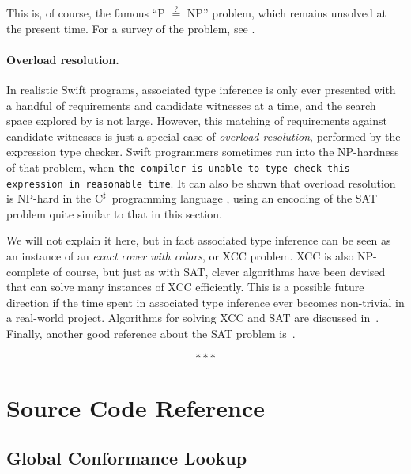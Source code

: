 \documentclass[../generics]{subfiles}
\begin{document}
This is, of course, the famous ``{P} $\stackrel{?}{=}$ {NP}'' problem, which remains unsolved at the present time. For a survey of the problem, see \cite{pvnp}.

\paragraph{Overload resolution.}
In realistic Swift programs, associated type inference is only ever presented with a handful of requirements and candidate witnesses at a time, and the search space explored by  is not large. However, this matching of requirements against candidate witnesses is just a special case of \emph{overload resolution}, performed by the expression type checker. Swift programmers sometimes run into the NP-hardness of that problem, when \texttt{the compiler is unable to type-check this expression in reasonable time}. It can also be shown that overload resolution is NP-hard in the $\mathrm{C}^\sharp$~programming language \cite{csharpsat}, using an encoding of the SAT problem quite similar to that in this section.

We will not explain it here, but in fact associated type inference can be seen as an instance of an \emph{exact cover with colors}, or XCC problem. XCC is also NP-complete of course, but just as with SAT, clever algorithms have been devised that can solve many instances of XCC efficiently. This is a possible future direction if the time spent in associated type inference ever becomes non-trivial in a real-world project. Algorithms for solving XCC and SAT are discussed in~\cite{art4b}. Finally, another good reference about the SAT problem is~\cite{sataa}.

\begin{ceqn}
\[\ast \ast \ast\]
\end{ceqn}

\vfill
\eject

\section{Source Code Reference}\label{src:conformances}

\subsection*{Global Conformance Lookup}
\end{document}
